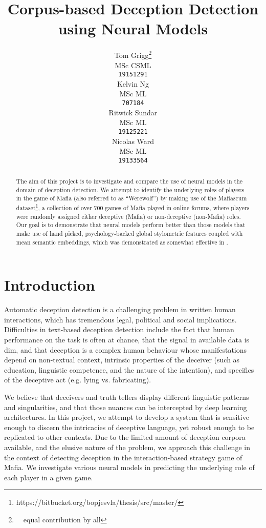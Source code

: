 \documentclass[11pt,a4paper]{article}
\title{Corpus-based Deception Detection using Neural Models}
\author{Tom Grigg\thanks{\ \ equal contribution by all}\\
  MSc CSML \\
  \texttt{19151291} \\\And
  Kelvin Ng\footnotemark[1]\\
  MSc ML \\
  \texttt{707184} \\\And
  Ritwick Sundar\footnotemark[1] \\
  MSc ML \\
  \texttt{19125221} \\\And
  Nicolas Ward\footnotemark[1] \\
  MSc ML \\
  \texttt{19133564}\\}
\date{}
\begin{document}
\maketitle
\begin{abstract}
  The aim of this project is to investigate and compare the use of neural models in the domain of deception detection. We attempt to identify the underlying roles of players in the game of Mafia (also referred to as ``Werewolf'') by making use of the Mafiascum dataset\footnote{https://bitbucket.org/bopjesvla/thesis/src/master/}, a collection of over 700 games of Mafia played in online forums, where players were randomly assigned either deceptive (Mafia) or non-deceptive (non-Mafia) roles.
  Our goal is to demonstrate that neural models perform better than those models that make use of hand picked, psychology-backed global stylometric features coupled with mean semantic embeddings, which was demonstrated as somewhat effective in \citet{Ruiter}.
\end{abstract}

\section{Introduction}

Automatic deception detection is a challenging problem in written human interactions, which has tremendous legal, political and social implications. Difficulties in text-based deception detection include the fact that human performance on the task is often at chance, that the signal in available data is dim, and that deception is a complex human behaviour whose manifestations depend on non-textual context, intrinsic properties of the deceiver (such as education, linguistic competence, and the nature of the intention), and specifics of the deceptive act (e.g. lying vs. fabricating).

We believe that deceivers and truth tellers display different linguistic patterns and singularities, and that those nuances can be intercepted by deep learning architectures. In this project, we attempt to develop a system that is sensitive enough to discern the intricacies of deceptive language, yet robust enough to be replicated to other contexts. Due to the limited amount of deception corpora available, and the elusive nature of the problem, we approach this challenge in the context of detecting deception in the interaction-based strategy game of Mafia. We investigate various neural models in predicting the underlying role of each player in a given game.
\end{document}

